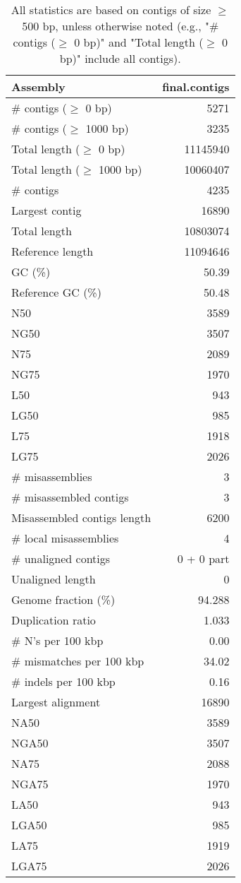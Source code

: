 \documentclass[12pt,a4paper]{article}
\begin{document}
\begin{table}[ht]
\begin{center}
\caption{All statistics are based on contigs of size $\geq$ 500 bp, unless otherwise noted (e.g., "\# contigs ($\geq$ 0 bp)" and "Total length ($\geq$ 0 bp)" include all contigs).}
\begin{tabular}{|l*{1}{|r}|}
\hline
Assembly & final.contigs \\ \hline
\# contigs ($\geq$ 0 bp) & 5271 \\ \hline
\# contigs ($\geq$ 1000 bp) & 3235 \\ \hline
Total length ($\geq$ 0 bp) & 11145940 \\ \hline
Total length ($\geq$ 1000 bp) & 10060407 \\ \hline
\# contigs & 4235 \\ \hline
Largest contig & 16890 \\ \hline
Total length & 10803074 \\ \hline
Reference length & 11094646 \\ \hline
GC (\%) & 50.39 \\ \hline
Reference GC (\%) & 50.48 \\ \hline
N50 & 3589 \\ \hline
NG50 & 3507 \\ \hline
N75 & 2089 \\ \hline
NG75 & 1970 \\ \hline
L50 & 943 \\ \hline
LG50 & 985 \\ \hline
L75 & 1918 \\ \hline
LG75 & 2026 \\ \hline
\# misassemblies & 3 \\ \hline
\# misassembled contigs & 3 \\ \hline
Misassembled contigs length & 6200 \\ \hline
\# local misassemblies & 4 \\ \hline
\# unaligned contigs & 0 + 0 part \\ \hline
Unaligned length & 0 \\ \hline
Genome fraction (\%) & 94.288 \\ \hline
Duplication ratio & 1.033 \\ \hline
\# N's per 100 kbp & 0.00 \\ \hline
\# mismatches per 100 kbp & 34.02 \\ \hline
\# indels per 100 kbp & 0.16 \\ \hline
Largest alignment & 16890 \\ \hline
NA50 & 3589 \\ \hline
NGA50 & 3507 \\ \hline
NA75 & 2088 \\ \hline
NGA75 & 1970 \\ \hline
LA50 & 943 \\ \hline
LGA50 & 985 \\ \hline
LA75 & 1919 \\ \hline
LGA75 & 2026 \\ \hline
\end{tabular}
\end{center}
\end{table}
\end{document}
